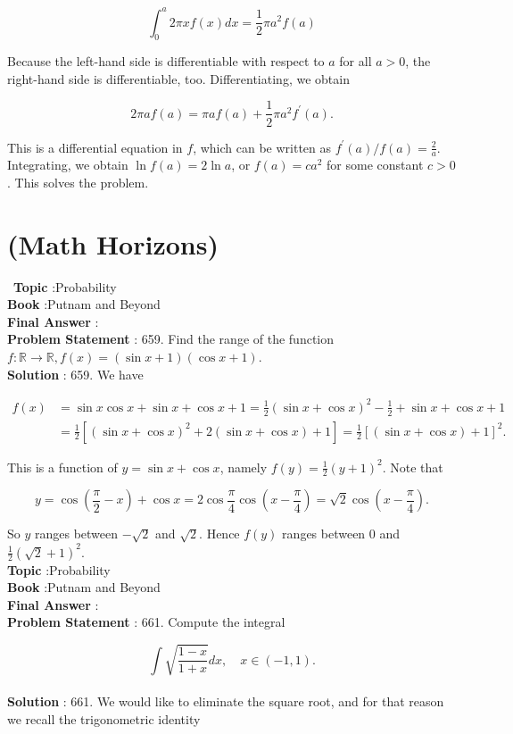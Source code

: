 \documentclass[10pt]{article}
\begin{document}
$$
\int_{0}^{a} 2 \pi x f(x) d x=\frac{1}{2} \pi a^{2} f(a)
$$

Because the left-hand side is differentiable with respect to $a$ for all $a>0$, the right-hand side is differentiable, too. Differentiating, we obtain

$$
2 \pi a f(a)=\pi a f(a)+\frac{1}{2} \pi a^{2} f^{\prime}(a) .
$$

This is a differential equation in $f$, which can be written as $f^{\prime}(a) / f(a)=\frac{2}{a}$. Integrating, we obtain $\ln f(a)=2 \ln a$, or $f(a)=c a^{2}$ for some constant $c>0$. This solves the problem.

\section{(Math Horizons)}\
\textbf{Topic} :Probability\\
\textbf{Book} :Putnam and Beyond\\
\textbf{Final Answer} :\\


\textbf{Problem Statement} :
659. Find the range of the function $f: \mathbb{R} \rightarrow \mathbb{R}, f(x)=(\sin x+1)(\cos x+1)$.
\\
\textbf{Solution} :
659. We have

$$
\begin{aligned}
f(x) &=\sin x \cos x+\sin x+\cos x+1=\frac{1}{2}(\sin x+\cos x)^{2}-\frac{1}{2}+\sin x+\cos x+1 \\
&=\frac{1}{2}\left[(\sin x+\cos x)^{2}+2(\sin x+\cos x)+1\right]=\frac{1}{2}[(\sin x+\cos x)+1]^{2} .
\end{aligned}
$$

This is a function of $y=\sin x+\cos x$, namely $f(y)=\frac{1}{2}(y+1)^{2}$. Note that

$$
y=\cos \left(\frac{\pi}{2}-x\right)+\cos x=2 \cos \frac{\pi}{4} \cos \left(x-\frac{\pi}{4}\right)=\sqrt{2} \cos \left(x-\frac{\pi}{4}\right) .
$$

So $y$ ranges between $-\sqrt{2}$ and $\sqrt{2}$. Hence $f(y)$ ranges between 0 and $\frac{1}{2}(\sqrt{2}+1)^{2}$.
\\
\textbf{Topic} :Probability\\
\textbf{Book} :Putnam and Beyond\\
\textbf{Final Answer} :\\


\textbf{Problem Statement} :
661. Compute the integral

$$
\int \sqrt{\frac{1-x}{1+x}} d x, \quad x \in(-1,1) .
$$
\\
\textbf{Solution} :
661. We would like to eliminate the square root, and for that reason we recall the trigonometric identity
\end{document}
